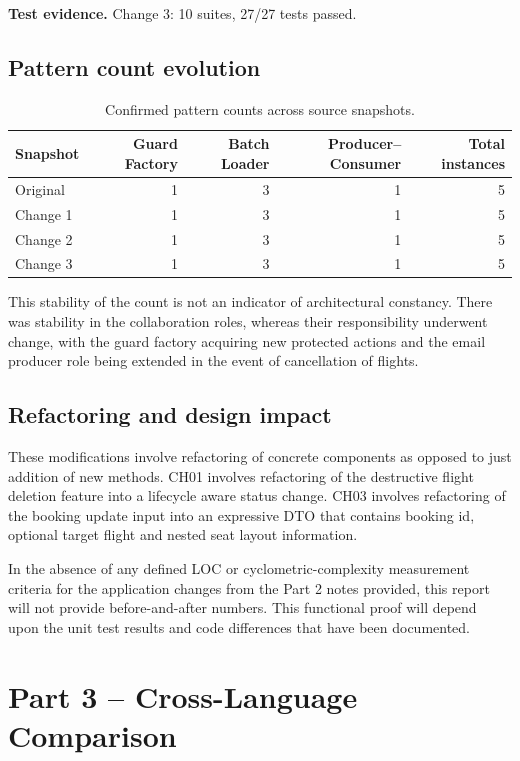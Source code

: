 \documentclass[11pt,a4paper]{article}
\begin{document}
\textbf{Test evidence.} Change 3: 10 suites, 27/27 tests passed.

\subsection{Pattern count evolution}
\begin{table}[H]
\centering
\begin{tabular}{lrrrr}
\toprule
Snapshot & Guard Factory & Batch Loader & Producer--Consumer & Total instances\\
\midrule
Original & 1 & 3 & 1 & 5\\
Change 1 & 1 & 3 & 1 & 5\\
Change 2 & 1 & 3 & 1 & 5\\
Change 3 & 1 & 3 & 1 & 5\\
\bottomrule
\end{tabular}
\caption{Confirmed pattern counts across source snapshots.}
\end{table}

This stability of the count is not an indicator of architectural constancy. There was stability in the collaboration roles, whereas their responsibility underwent change, with the guard factory acquiring new protected actions and the email producer role being extended in the event of cancellation of flights.

\subsection{Refactoring and design impact}
These modifications involve refactoring of concrete components as opposed to just addition of new methods. CH01 involves refactoring of the destructive flight deletion feature into a lifecycle aware status change. CH03 involves refactoring of the booking update input into an expressive DTO that contains booking id, optional target flight and nested seat layout information.

In the absence of any defined LOC or cyclometric-complexity measurement criteria for the application changes from the Part 2 notes provided, this report will not provide before-and-after numbers. This functional proof will depend upon the unit test results and code differences that have been documented.

\section{Part 3 -- Cross-Language Comparison}
\end{document}
